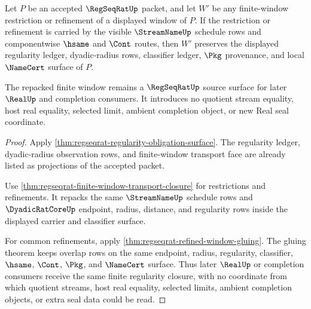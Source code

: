 \begin{theorem}
\label{thm:regseqrat-finite-window-regular-closure}
Let $P$ be an accepted $\RegSeqRatUp$ packet, and let $W'$ be any finite-window restriction or refinement of a displayed window of $P$. If the restriction or refinement is carried by the visible $\StreamNameUp$ schedule rows and componentwise $\hsame$ and $\Cont$ routes, then $W'$ preserves the displayed regularity ledger, dyadic-radius rows, classifier ledger, $\Pkg$ provenance, and local $\NameCert$ surface of $P$.

The repacked finite window remains a $\RegSeqRatUp$ source surface for later $\RealUp$ and completion consumers. It introduces no quotient stream equality, host real equality, selected limit, ambient completion object, or new Real seal coordinate.
\end{theorem}
\begin{proof}
Apply \autoref{thm:regseqrat-regularity-obligation-surface}. The regularity ledger, dyadic-radius observation rows, and finite-window transport face are already listed as projections of the accepted packet.

Use \autoref{thm:regseqrat-finite-window-transport-closure} for restrictions and refinements. It repacks the same $\StreamNameUp$ schedule rows and $\DyadicRatCoreUp$ endpoint, radius, distance, and regularity rows inside the displayed carrier and classifier surface.

For common refinements, apply \autoref{thm:regseqrat-refined-window-gluing}. The gluing theorem keeps overlap rows on the same endpoint, radius, regularity, classifier, $\hsame$, $\Cont$, $\Pkg$, and $\NameCert$ surface. Thus later $\RealUp$ or completion consumers receive the same finite regularity closure, with no coordinate from which quotient streams, host real equality, selected limits, ambient completion objects, or extra seal data could be read.
\end{proof}
